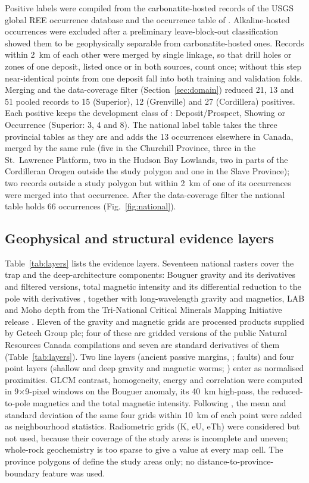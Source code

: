 \documentclass[pdflatex,sn-apa]{sn-jnl}
\begin{document}
Positive labels were compiled from the carbonatite-hosted records of the USGS global REE occurrence database \citep{Orris2018} and the occurrence table of \citet{Parsa2024}. Alkaline-hosted occurrences were excluded after a preliminary leave-block-out classification showed them to be geophysically separable from carbonatite-hosted ones. Records within 2~km of each other were merged by single linkage, so that drill holes or zones of one deposit, listed once or in both sources, count once; without this step near-identical points from one deposit fall into both training and validation folds. Merging and the data-coverage filter (Section~\ref{sec:domain}) reduced 21, 13 and 51 pooled records to 15 (Superior), 12 (Grenville) and 27 (Cordillera) positives. Each positive keeps the development class of \citet{Parsa2024}: Deposit/Prospect, Showing or Occurrence (Superior: 3, 4 and 8). The national label table takes the three provincial tables as they are and adds the 13 occurrences elsewhere in Canada, merged by the same rule (five in the Churchill Province, three in the St.~Lawrence Platform, two in the Hudson Bay Lowlands, two in parts of the Cordilleran Orogen outside the study polygon and one in the Slave Province); two records outside a study polygon but within 2~km of one of its occurrences were merged into that occurrence. After the data-coverage filter the national table holds 66 occurrences (Fig.~\ref{fig:national}).

\subsection{Geophysical and structural evidence layers}\label{sec:layers}

Table~\ref{tab:layers} lists the evidence layers. Seventeen national rasters cover the trap and the deep-architecture components: Bouguer gravity and its derivatives and filtered versions, total magnetic intensity and its differential reduction to the pole with derivatives \citep{Jobin2017,Miles2016}, together with long-wavelength gravity and magnetics, LAB and Moho depth from the Tri-National Critical Minerals Mapping Initiative release \citep{McCafferty2023}. Eleven of the gravity and magnetic grids are processed products supplied by Getech Group plc; four of these are gridded versions of the public Natural Resources Canada compilations and seven are standard derivatives of them (Table~\ref{tab:layers}). Two line layers (ancient passive margins, \citealp{BradleyDC2008}; faults) and four point layers (shallow and deep gravity and magnetic worms; \citealp{McCafferty2023}) enter as normalised proximities. GLCM contrast, homogeneity, energy and correlation were computed in 9$\times$9-pixel windows on the Bouguer anomaly, its 40~km high-pass, the reduced-to-pole magnetics and the total magnetic intensity. Following \citet{Luo2026}, the mean and standard deviation of the same four grids within 10~km of each point were added as neighbourhood statistics. Radiometric grids (K, eU, eTh) were considered but not used, because their coverage of the study areas is incomplete and uneven; whole-rock geochemistry is too sparse to give a value at every map cell. The province polygons of \citet{Wheeler1996} define the study areas only; no distance-to-province-boundary feature was used.
\end{document}

